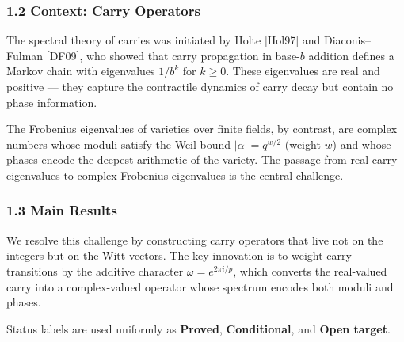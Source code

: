 \documentclass[
  11pt,
]{article}
\begin{document}
\subsubsection{1.2 Context: Carry Operators}\label{context-carry-operators}

The spectral theory of carries was initiated by Holte {[}Hol97{]} and
Diaconis--Fulman {[}DF09{]}, who showed that carry propagation in base-\(b\)
addition defines a Markov chain with eigenvalues \(1/b^k\) for \(k \geq 0\).
These eigenvalues are real and positive --- they capture the contractile
dynamics of carry decay but contain no phase information.

The Frobenius eigenvalues of varieties over finite fields, by contrast, are
complex numbers whose moduli satisfy the Weil bound
\(\lvert\alpha\rvert = q^{w/2}\) (weight \(w\)) and whose phases encode the
deepest arithmetic of the variety. The passage from real carry eigenvalues to
complex Frobenius eigenvalues is the central challenge.

\subsubsection{1.3 Main Results}\label{main-results}

We resolve this challenge by constructing carry operators that live not on the
integers but on the Witt vectors. The key innovation is to weight carry
transitions by the additive character \(\omega = e^{2\pi i/p}\), which converts
the real-valued carry into a complex-valued operator whose spectrum encodes both
moduli and phases.

Status labels are used uniformly as \textbf{Proved}, \textbf{Conditional}, and
\textbf{Open target}.
\end{document}
